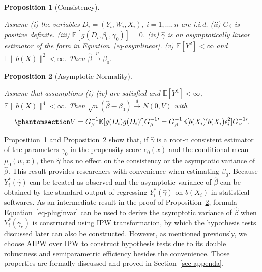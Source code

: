 \documentclass[
  12pt,
  12pt]{article}
\numberwithin{equation}{section}
\theoremstyle{definition}
\theoremstyle{plain}
\newtheorem{proposition}{Proposition}[section]
\theoremstyle{plain}
\theoremstyle{remark}
\begin{document}
\begin{proposition}[Consistency]\protect\hypertarget{prp-consistency}{}\label{prp-consistency}

Assume (i) the variables \(D_i = (Y_i, W_i, X_i)\), \(i = 1, ..., n\)
are i.i.d. (ii) \(G_\beta\) is positive definite. (iii)
\(\mathbb{E}[g(D_i, \beta_0, \gamma_0)] = 0\). (iv) \(\hat\gamma\) is an
asymptotically linear estimator of the form in
Equation~\ref{eq-asymlinear}. (v) \(\mathbb{E}[Y^2] < \infty\) and
\(\mathbb{E}\|b(X)\|^2 < \infty\). Then
\(\hat\beta \xrightarrow{p} \beta_0\).

\end{proposition}

\begin{proposition}[Asymptotic
Normality]\protect\hypertarget{prp-main}{}\label{prp-main}

Assume that assumptions (i)-(iv) are satisfied and
\(\mathbb{E}[Y^4] < \infty\), \(\mathbb{E}\|b(X)\|^4 < \infty\). Then
\(\sqrt{n}(\hat\beta - \beta_0) \xrightarrow{d} N(0, V)\) with
\begin{equation}\phantomsection\label{eq-variance}{
V = G_\beta^{-1}\mathbb{E}[g(D_i)g(D_i)']G_\beta^{-1}{'} = G_\beta^{-1}\mathbb{E}[b(X_i)'b(X_i)\epsilon_i^2]G_\beta^{-1}{'}.
}\end{equation}

\end{proposition}

Proposition~\ref{prp-consistency} and Proposition~\ref{prp-main} show
that, if \(\hat\gamma\) is a root-n consistent estimator of the
parameters \(\gamma_0\) in the propensity score \(e_0(x)\) and the
conditional mean \(\mu_0(w, x)\), then \(\hat\gamma\) has no effect on
the consistency or the asymptotic variance of \(\hat\beta\). This result
provides researchers with convenience when estimating \(\beta_0\).
Because \(Y_i^*(\hat\gamma)\) can be treated as observed and the
asymptotic variance of \(\hat\beta\) can be obtained by the standard
output of regressing \(Y^*_i(\hat\gamma)\) on \(b(X_i)\) in statistical
softwares. As an intermediate result in the proof of
Proposition~\ref{prp-main}, formula Equation~\ref{eq-pluginvar} can be
used to derive the asymptotic variance of \(\hat\beta\) when
\(Y_i^*(\gamma_e)\) is constructed using IPW transformation, by which
the hypothesis tests discussed later can also be constructed. However,
as mentioned previously, we choose AIPW over IPW to construct hypothesis
tests due to its double robustness and semiparametric efficiency besides
the convenience. Those properties are formally discussed and proved in
Section~\ref{sec-appenda}.
\end{document}
